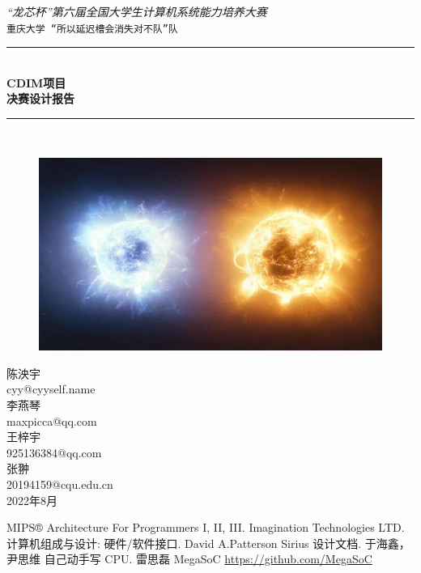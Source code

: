 \documentclass[black,normal,cn,hide]{elegantbook}
\newcommand{\artdate}{2022年8月}
\newcommand{\cpuname}{CDIM}
\newcommand{\hlrule}{\rule{\linewidth}{0.5mm}}
\begin{document}
\begin{titlepage}
    \vfill
    \center 
    \textit{\Large “龙芯杯”第六届全国大学生计算机系统能力培养大赛}\\[0.5cm] 
    \texttt{\Large 重庆大学 “所以延迟槽会消失对不队”队}
  
    \vspace{1.5 cm}
    \hlrule \\[0.4 cm]
    { \huge \bfseries \cpuname 项目}\\[0.4cm]
    { \huge \bfseries 决赛设计报告}\\
    \hlrule \\[1cm]
   
    \begin{figure}[h]
      \centering
      \includegraphics[width=0.5\linewidth]{logo.png}
    \end{figure}
   \vspace{0.5 cm}
  
    \vspace{.5 cm}
    陈泱宇\\
    cyy@cyyself.name\\
    \vspace{.5 cm}
    李燕琴\\
    maxpicca@qq.com\\
    \vspace{.5 cm}
    王梓宇\\
    925136384@qq.com\\
    \vspace{.5 cm}
    张翀\\
    20194159@cqu.edu.cn\\
  
    \vspace{2 cm}
    {\large \artdate}\\[3cm] 
  
  \vfill
  
\end{titlepage}

\tableofcontents
\mainmatter










\newpage
\renewcommand{\bibname}{参考资料}
\begin{thebibliography}{99}
	 MIPS® Architecture For Programmers I, II, III. Imagination Technologies LTD.  
   计算机组成与设计: 硬件/软件接口. David A.Patterson
   Sirius 设计文档. 于海鑫，尹思维
   自己动手写 CPU. 雷思磊
   MegaSoC \url{https://github.com/MegaSoC}
\end{thebibliography}
\end{document}
